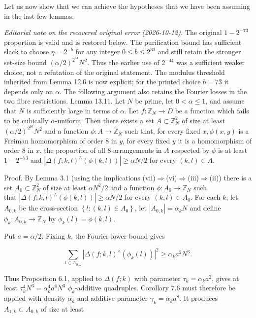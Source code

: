 \documentclass[10pt]{article}
\begin{document}
Let us now show that we can achieve the hypotheses that we have been assuming in the last few lemmas.

\emph{Editorial note on the recovered original error (2026-10-12).}
The original $1-2^{-73}$ proportion is valid and is restored below.
The purification bound has sufficient slack to choose $\eta=2^{-b}$ for
any integer $0\leqslant b\leqslant2^{30}$ and still retain the stronger
set-size bound $(\alpha/2)^{2^{64}}N^2$. Thus the earlier use of $2^{-44}$
was a sufficient weaker choice, not a refutation of the original statement.
The modulus threshold inherited from Lemma 12.6 is now explicit; for the
printed choice $b=73$ it depends only on $\alpha$. The following argument
also retains the Fourier losses in the two fibre restrictions.
Lemma 13.11. Let $N$ be prime, let $0<\alpha\leqslant1$, and assume that $N$ is sufficiently large in terms of $\alpha$. Let $f: \mathbb{Z}_{N} \rightarrow D$ be a function which fails to be cubically $\alpha$-uniform. Then there exists a set $A \subset \mathbb{Z}_{N}^{2}$ of size at least $(\alpha / 2)^{2^{66}} N^{2}$ and a function $\phi: A \rightarrow \mathbb{Z}_{N}$ such that, for every fixed $x, \phi(x, y)$ is a Freiman homomorphism of order 8 in $y$, for every fixed $y$ it is a homomorphism of order 8 in $x$, the proportion of all 8-arrangements in $A$ respected by $\phi$ is at least $1-2^{-73}$ and $\left|\Delta(f ; k, l)^{\wedge}(\phi(k, l))\right| \geqslant \alpha N / 2$ for every $(k, l) \in A$.

Proof. By Lemma 3.1 (using the implications (vii)$\Rightarrow$(vi)$\Rightarrow$(iii)$\Rightarrow$(ii)) there is a set $A_{0} \subset \mathbb{Z}_{N}^{2}$ of size at least $\alpha N^{2} / 2$ and a function $\phi: A_{0} \rightarrow \mathbb{Z}_{N}$ such\\
that $\left|\Delta(f ; k, l)^{\wedge}(\phi(k, l))\right| \geqslant \alpha N / 2$ for every $(k, l) \in A_{0}$. For each $k$, let $A_{0, k}$ be the cross-section $\left\{l:(k, l) \in A_{0}\right\}$, let $\left|A_{0, k}\right|=\alpha_{k} N$ and define $\phi_{k}: A_{0, k} \rightarrow \mathbb{Z}_{N}$ by $\phi_{k}(l)=\phi(k, l)$.

Put $a=\alpha/2$.  Fixing $k$, the Fourier lower bound gives

$$
\sum_{l\in A_{0,k}}\left|\Delta(f;k,l)^{\wedge}(\phi_k(l))\right|^2
 \geqslant \alpha_k a^2N^3.
$$

Thus Proposition 6.1, applied to $\Delta(f;k)$ with parameter
$\tau_k=\alpha_k a^2$, gives at least
$\tau_k^4N^3=\alpha_k^4a^8N^3$ $\phi_k$-additive quadruples.  Corollary 7.6
must therefore be applied with density $\alpha_k$ and additive parameter
$\gamma_k=\alpha_ka^8$.  It produces $A_{1,k}\subset A_{0,k}$ of size at
least
\end{document}
